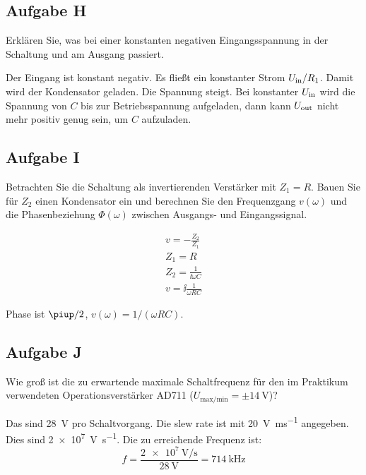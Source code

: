 \subsection{Aufgabe H}

\begin{problem}
	Erklären Sie, was bei einer konstanten negativen Eingangsspannung in der
	Schaltung und am Ausgang passiert.
\end{problem}

Der Eingang ist konstant negativ. Es fließt ein konstanter Strom $U_\text{in}/R_1$.
Damit wird der Kondensator geladen. Die Spannung steigt. Bei konstanter $U_\text{in}$
wird die Spannung von $C$ bis zur Betriebsspannung aufgeladen, dann kann
$U_\text{out}$ nicht mehr positiv genug sein, um $C$ aufzuladen.

\subsection{Aufgabe I}

\begin{problem}
	Betrachten Sie die Schaltung als invertierenden Verstärker mit $Z_1 = R$.
	Bauen Sie für $Z_2$ einen Kondensator ein und berechnen Sie den
	Frequenzgang $v(\omega)$ und die Phasenbeziehung $\Phi(\omega)$ zwischen
	Ausgangs- und Eingangssignal.
\end{problem}

\begin{gather*}
	v = - \frac{Z_2}{Z_1} \\
	Z_1 = R \\
	Z_2 = \frac{1}{\ii \omega C} \\
	v = \ii \frac{1}{\omega RC}
\end{gather*}

Phase ist $\piup/2$, $v(\omega) = 1 / (\omega RC)$.

\subsection{Aufgabe J}

\begin{problem}
	Wie groß ist die zu erwartende maximale Schaltfrequenz für den im Praktikum
	verwendeten Operationsverstärker AD711 ($U_\text{max/min} = \pm
	\SI{14}\volt$)?
\end{problem}

Das sind \SI{28}{\volt} pro Schaltvorgang. Die slew rate ist mit
\SI{20}{\volt\per\milli\second} angegeben. Dies sind
\SI{2e7}{\volt\per\second}. Die zu erreichende Frequenz ist:
\[
	f = \frac{\SI{2e7}{\volt\per\second}}{\SI{28}\volt} = \SI{714}{\kilo\hertz}
\]

